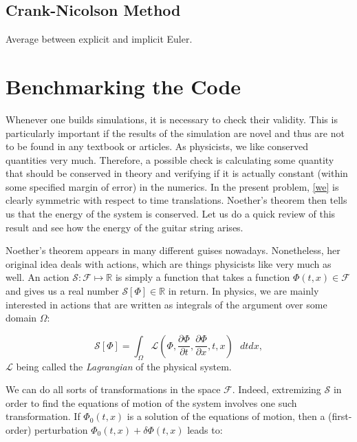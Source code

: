 \documentclass{article}
\begin{document}
\subsection{Crank-Nicolson Method}
Average between explicit and implicit Euler.

\section{Benchmarking the Code}

Whenever one builds simulations, it is necessary to check their validity. This is particularly important if the results of the simulation are novel and thus are not to be found in any textbook or articles. As physicists, we like conserved quantities very much. Therefore, a possible check is calculating some quantity that should be conserved in theory and verifying if it is actually constant (within some specified margin of error) in the numerics. In the present problem, \eqref{we} is clearly symmetric with respect to time translations. Noether's theorem then tells us that the energy of the system is conserved. Let us do a quick review of this result and see how the energy of the guitar string arises.

Noether's theorem appears in many different guises nowadays. Nonetheless, her original idea deals with actions, which are things physicists like very much as well. An action $\mathcal{S}:\mathcal{F}\mapsto\mathbb{R}$ is simply a function that takes a function $\Phi(t,x)\in\mathcal{F}$ and gives us a real number $\mathcal{S}[\Phi]\in\mathbb{R}$ in return. In physics, we are mainly interested in actions that are written as integrals of the argument over some domain $\Omega$:

\begin{equation}\label{actiondef}
\mathcal{S}[\Phi]=\int_\Omega\mathcal{L}\left(\Phi,\frac{\partial \Phi}{\partial t},\frac{\partial \Phi}{\partial x},t,x\right)\text{ }dtdx,
\end{equation}
$\mathcal{L}$ being called the \textit{Lagrangian} of the physical system.

We can do all sorts of transformations in the space $\mathcal{F}$. Indeed, extremizing $\mathcal{S}$ in order to find the equations of motion of the system involves one such transformation. If $\Phi_0(t,x)$ is a solution of the equations of motion, then a (first-order) perturbation $\Phi_0(t,x)+\delta\Phi(t,x)$ leads to:
\end{document}
